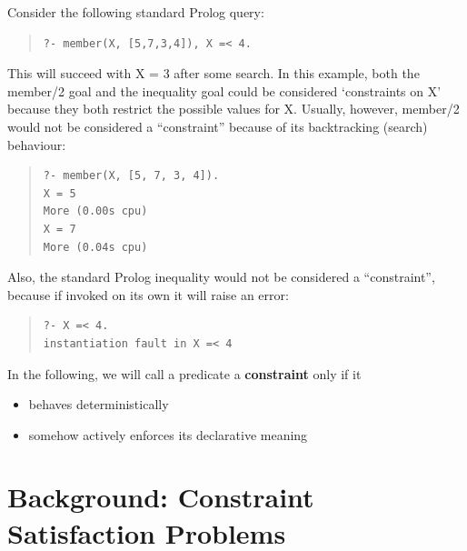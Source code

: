 Consider the following standard Prolog query:
\begin{quote}\begin{verbatim}
?- member(X, [5,7,3,4]), X =< 4.
\end{verbatim}\end{quote}
This will succeed with X = 3 after some search.
In this example, both the member/2 goal and the inequality goal could
be considered `constraints on X' because they both restrict the
possible values for X. Usually, however, member/2 would not be considered
a ``constraint'' because of its backtracking (search) behaviour:
\begin{quote}\begin{verbatim}
?- member(X, [5, 7, 3, 4]).
X = 5
More (0.00s cpu)
X = 7
More (0.04s cpu)
\end{verbatim}\end{quote}
Also, the standard Prolog inequality would not be considered a ``constraint'',
because if invoked on its own it will raise an error:
\begin{quote}\begin{verbatim}
?- X =< 4.
instantiation fault in X =< 4
\end{verbatim}\end{quote}
In the following, we will call a predicate a {\bf constraint} only if it
\begin{itemize}
\item behaves deterministically
\item somehow actively enforces its declarative meaning
\end{itemize}


\section{Background: Constraint Satisfaction Problems}
\label{csp}

